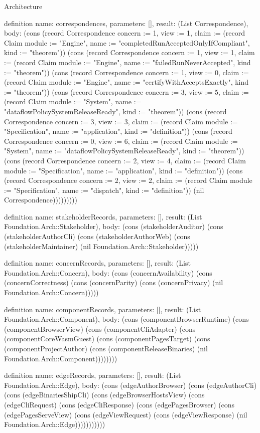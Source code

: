 \begin{lexlean}{Architecture}
\begin{semanticmodule}
definition{
  name: correspondences,
  parameters: [],
  result: (List Correspondence),
  body: (cons (record Correspondence {concern := 1, view := 1, claim := (record Claim {module := "Engine", name := "completedRunAcceptedOnlyIfCompliant", kind := "theorem"})}) (cons (record Correspondence {concern := 1, view := 1, claim := (record Claim {module := "Engine", name := "failedRunNeverAccepted", kind := "theorem"})}) (cons (record Correspondence {concern := 1, view := 0, claim := (record Claim {module := "Engine", name := "certifyWithAcceptsExactly", kind := "theorem"})}) (cons (record Correspondence {concern := 3, view := 5, claim := (record Claim {module := "System", name := "dataflowPolicySystemReleaseReady", kind := "theorem"})}) (cons (record Correspondence {concern := 3, view := 3, claim := (record Claim {module := "Specification", name := "application", kind := "definition"})}) (cons (record Correspondence {concern := 0, view := 6, claim := (record Claim {module := "System", name := "dataflowPolicySystemReleaseReady", kind := "theorem"})}) (cons (record Correspondence {concern := 2, view := 4, claim := (record Claim {module := "Specification", name := "application", kind := "definition"})}) (cons (record Correspondence {concern := 2, view := 2, claim := (record Claim {module := "Specification", name := "dispatch", kind := "definition"})}) (nil Correspondence)))))))))
}

definition{
  name: stakeholderRecords,
  parameters: [],
  result: (List Foundation.Arch::Stakeholder),
  body: (cons (stakeholderAuditor) (cons (stakeholderAuthorCli) (cons (stakeholderAuthorWeb) (cons (stakeholderMaintainer) (nil Foundation.Arch::Stakeholder)))))
}

definition{
  name: concernRecords,
  parameters: [],
  result: (List Foundation.Arch::Concern),
  body: (cons (concernAvailability) (cons (concernCorrectness) (cons (concernParity) (cons (concernPrivacy) (nil Foundation.Arch::Concern)))))
}

definition{
  name: componentRecords,
  parameters: [],
  result: (List Foundation.Arch::Component),
  body: (cons (componentBrowserRuntime) (cons (componentBrowserView) (cons (componentCliAdapter) (cons (componentCoreWasmGuest) (cons (componentPagesTarget) (cons (componentProjectAuthor) (cons (componentReleaseBinaries) (nil Foundation.Arch::Component))))))))
}

definition{
  name: edgeRecords,
  parameters: [],
  result: (List Foundation.Arch::Edge),
  body: (cons (edgeAuthorBrowser) (cons (edgeAuthorCli) (cons (edgeBinariesShipCli) (cons (edgeBrowserHostsView) (cons (edgeCliRequest) (cons (edgeCliResponse) (cons (edgePagesBrowser) (cons (edgePagesServeView) (cons (edgeViewRequest) (cons (edgeViewResponse) (nil Foundation.Arch::Edge)))))))))))
}


\end{semanticmodule}
\end{lexlean}

